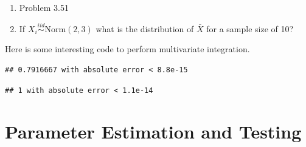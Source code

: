 \documentclass[]{book}
\newenvironment{Shaded}{\begin{snugshade}}{\end{snugshade}}
\newcommand{\KeywordTok}[1]{\textcolor[rgb]{0.13,0.29,0.53}{\textbf{#1}}}
\newcommand{\DecValTok}[1]{\textcolor[rgb]{0.00,0.00,0.81}{#1}}
\newcommand{\ControlFlowTok}[1]{\textcolor[rgb]{0.13,0.29,0.53}{\textbf{#1}}}
\newcommand{\OperatorTok}[1]{\textcolor[rgb]{0.81,0.36,0.00}{\textbf{#1}}}
\newcommand{\NormalTok}[1]{#1}
\theoremstyle{definition}
\theoremstyle{definition}
\theoremstyle{definition}
\theoremstyle{remark}
\begin{document}
\begin{enumerate}
\def\labelenumi{\arabic{enumi}.}
\setcounter{enumi}{2}
\item
  Problem 3.51
\item
  If \(X_{i} \overset{iid}{\sim} \mbox{Norm} (2,3)\) what is the
  distribution of \(\bar{X}\) for a sample size of 10?
\end{enumerate}

Here is some interesting code to perform multivariate integration.

\begin{Shaded}
\end{Shaded}

\begin{verbatim}
## 0.7916667 with absolute error < 8.8e-15
\end{verbatim}

\begin{Shaded}
\end{Shaded}

\begin{verbatim}
## 1 with absolute error < 1.1e-14
\end{verbatim}

\chapter{Parameter Estimation and Testing}\label{Chpt4}
\end{document}
